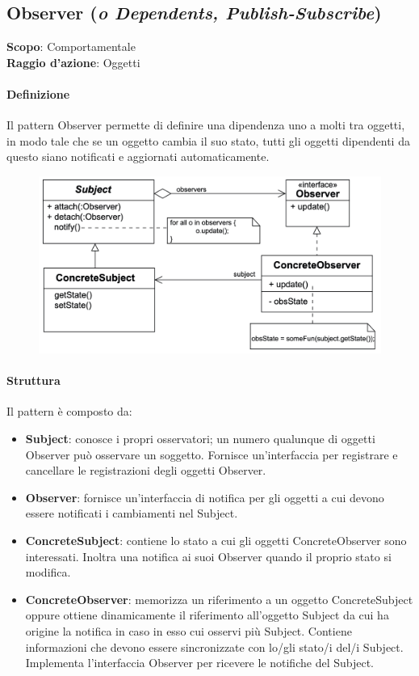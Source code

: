 \subsection{Observer (\textit{o Dependents, Publish-Subscribe})}
\label{observer}

\textbf{Scopo}: Comportamentale \\
\textbf{Raggio d'azione}: Oggetti

\paragraph{Definizione} Il pattern Observer permette di definire una dipendenza uno a molti tra oggetti, in modo tale che se un oggetto cambia il suo stato, tutti gli oggetti dipendenti da questo siano notificati e aggiornati automaticamente.

\begin{figure}[H]
    \centering
    \includegraphics[width=1\linewidth]{assets/pattern/observer/observer-struttura.png}
\end{figure}

\paragraph{Struttura} Il pattern è composto da:
\begin{itemize}
    \item \textbf{Subject}: conosce i propri osservatori; un numero qualunque di oggetti Observer può osservare un soggetto. Fornisce un’interfaccia per registrare e cancellare le registrazioni degli oggetti Observer. 
    \item \textbf{Observer}: fornisce un’interfaccia di notifica per gli oggetti a cui devono essere notificati i cambiamenti nel Subject. 
    \item \textbf{ConcreteSubject}: contiene lo stato a cui gli oggetti 
     ConcreteObserver sono interessati. Inoltra una notifica ai suoi Observer quando il proprio stato si modifica. 
    \item \textbf{ConcreteObserver}: memorizza un riferimento a un oggetto ConcreteSubject oppure ottiene dinamicamente il riferimento all’oggetto Subject da cui ha origine la notifica in caso in esso cui osservi più Subject. Contiene informazioni che devono essere sincronizzate con lo/gli stato/i del/i Subject. Implementa l’interfaccia Observer per ricevere le notifiche del Subject.
\end{itemize}

